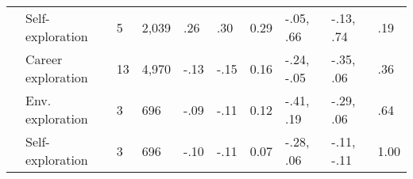\begin{table}[ht]
\begin{tabular}{llllllllll}
   & \hspace{0.8em}Self-exploration & 5 & 2,039 & .26 & .30 & 0.29 & -.05, .66 & -.13, .74 & .19 \\ 
   & Career exploration & 13 & 4,970 & -.13 & -.15 & 0.16 & -.24, -.05 & -.35, .06 & .36 \\ 
   & \hspace{0.8em}Env. exploration & 3 & 696 & -.09 & -.11 & 0.12 & -.41, .19 & -.29, .06 & .64 \\ 
   & \hspace{0.8em}Self-exploration & 3 & 696 & -.10 & -.11 & 0.07 & -.28, .06 & -.11, -.11 & 1.00 \\ 
   \hline
\end{tabular}
\end{table}
